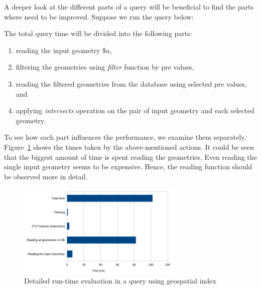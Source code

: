 \documentclass[a4paper,12pt]{article}
\begin{document}
A deeper look at the different parts of a query will be beneficial to find the parts where need to be improved. Suppose we run the query below:
\vspace{10px}
\vspace{10px}
The total query time will be divided into the following parts:

\begin{enumerate}
\item reading the input geometry $\$a$,
\item filtering the geometries using \textit{filter} function by pre values,
\item reading the filtered geometries from the database using selected pre values, and
\item applying \textit{intersects} operation on the pair of input geometry and each selected geometry.
\end{enumerate}

To see how each part influences the performance, we examine them separately. Figure~\ref{figDetailedTiming} shows the times taken by the above-mentioned actions. It could be seen that the biggest amount of time is spent reading the geometries. Even reading the single input geometry seems to be expensive. Hence, the reading function should be observed more in detail.

\begin{figure}
\centering
\includegraphics[width=0.7\textwidth,height=0.2\textheight]{detailedTiming}
\caption{Detailed run-time evaluation in a query using geospatial index}
\label{figDetailedTiming}
\end{figure}
\end{document}
